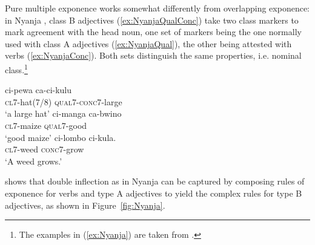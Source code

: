 \documentclass[output=paper
	        ,collection
	        ,collectionchapter
 	        ,biblatex
                ,babelshorthands
                ,newtxmath
                ,draftmode
                ,colorlinks, citecolor=brown
]{langscibook}
\begin{document}
\begin{exe}
\begin{xlist}
\begin{exe}
\begin{xlist}
Pure multiple exponence works somewhat differently from
overlapping exponence: in Nyanja \citep{Stump01,Crysmann:14:OUP},
class B adjectives (\ref{ex:NyanjaQualConc}) take two class markers to
mark agreement with the head noun, one set of markers being the one
normally used with class A adjectives (\ref{ex:NyanjaQual}), the other being attested with
verbs (\ref{ex:NyanjaConc}). Both sets distinguish the same
properties, i.e. nominal class.\label{Nyanja}\footnote{The examples in (\ref{ex:Nyanja}) are taken from .}

\eal
\label{ex:Nyanja}
\ex\label{ex:NyanjaQualConc}
\gll ci-pewa ca-ci-kulu\\
    \textsc{cl7}-hat(7/8) \textsc{qual7}-\textsc{conc7}-large\\
\glt `a large hat'
\ex
\label{ex:NyanjaQual} 
\gll ci-manga ca-bwino\\
    \textsc{cl7}-maize \textsc{qual7}-good\\
\glt `good maize'
\ex
\label{ex:NyanjaConc} 
\gll ci-lombo ci-kula.\\
    \textsc{cl7}-weed \textsc{conc7}-grow\\
\glt `A weed grows.'
\zl

\citet{Crysmann:14:OUP} shows that double inflection as in Nyanja
can be captured by composing rules of exponence for verbs and type A
adjectives to yield the complex rules for type B adjectives, as shown
in Figure~\ref{fig:Nyanja}. 


\end{xlist}
\end{exe}
\end{xlist}
\end{exe}
\end{document}
